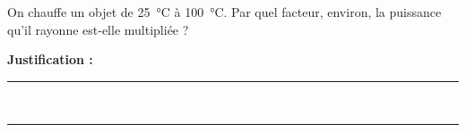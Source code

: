 On chauffe un objet de \qty{25}{\degreeCelsius} à \qty{100}{\degreeCelsius}. Par quel facteur, environ, la puissance qu'il rayonne est-elle multipliée ?

\choices

\noindent\textbf{Justification :} \hrulefill \\[2.5ex]
\rule{\linewidth}{0.4pt} \\[2.5ex]
\rule{\linewidth}{0.4pt}
\vfill
